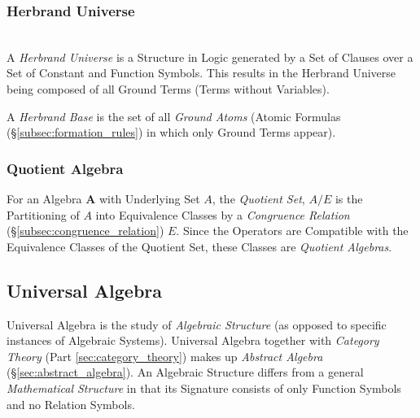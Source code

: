 \subsubsection{Herbrand Universe}\label{subsec:herbrand_universe}
\hfill \\
A \emph{Herbrand Universe} is a Structure in Logic generated by a Set
of Clauses over a Set of Constant and Function Symbols. This results
in the Herbrand Universe being composed of all Ground Terms (Terms
without Variables).

A \emph{Herbrand Base} is the set of all \emph{Ground Atoms} (Atomic
Formulas (\S\ref{subsec:formation_rules}) in which only Ground Terms
appear).

\subsubsection{Quotient Algebra}\label{subsec:quotient_algebra}

For an Algebra $\mathbf{A}$ with Underlying Set $A$, the
\emph{Quotient Set}, $A / E$ is the Partitioning of $A$ into
Equivalence Classes by a \emph{Congruence Relation}
(\S\ref{subsec:congruence_relation}) $E$. Since the Operators are
Compatible with the Equivalence Classes of the Quotient Set, these
Classes are \emph{Quotient Algebras}.



\subsection{Universal Algebra}\label{subsec:universal_algebra}

Universal Algebra is the study of \emph{Algebraic Structure} (as
opposed to specific instances of Algebraic Systems). Universal Algebra
together with \emph{Category Theory} (Part \ref{sec:category_theory})
makes up \emph{Abstract Algebra} (\S\ref{sec:abstract_algebra}). An
Algebraic Structure differs from a general \emph{Mathematical
  Structure} in that its Signature consists of only Function Symbols
and no Relation Symbols.

